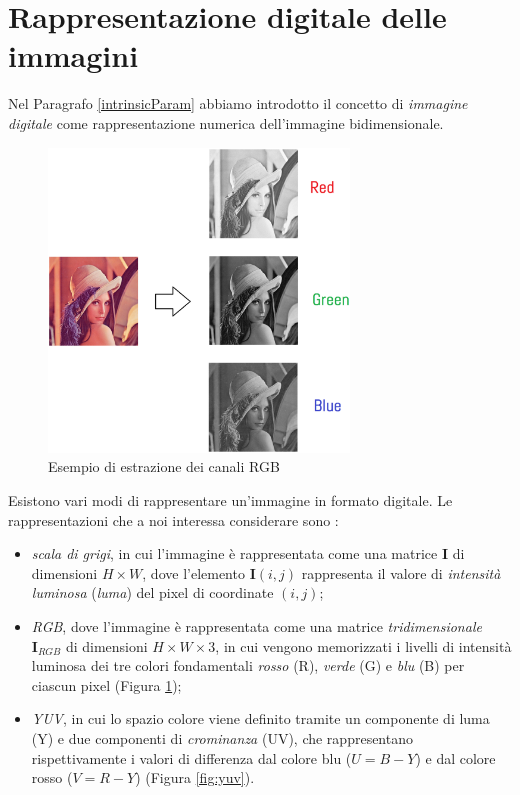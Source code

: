 \section{Rappresentazione digitale delle immagini}
\label{rappresentazImmagini}
Nel Paragrafo \ref{intrinsicParam} abbiamo introdotto il concetto di \textit{immagine digitale} come rappresentazione numerica dell'immagine bidimensionale.
	\begin{figure}[tb]
		\centering
		\includegraphics[width=8cm]{./pictures/lenaRGB}
		\caption{Esempio di estrazione dei canali RGB}
		\label{fig:lenaRGB}
	\end{figure}
Esistono vari modi di rappresentare un'immagine in formato digitale.
Le rappresentazioni che a noi interessa considerare sono \cite{forsyth2002computer}:
\begin{itemize}
	\item \textit{scala di grigi}, in cui l'immagine \`e rappresentata come una matrice $\textbf{I}$ di dimensioni $H \times W$, dove l'elemento $\textbf{I}(i,j)$ rappresenta il valore di \textit{intensit\`a luminosa} (\textit{luma}) del pixel di coordinate $(i, j)$;
	\item \textit{RGB}, dove l'immagine \`e rappresentata come una matrice \textit{tridimensionale} $\textbf{I}_{RGB}$ di dimensioni $H \times W \times 3$, in cui vengono memorizzati i livelli di intensit\`a luminosa dei tre colori fondamentali \textit{rosso} (R), \textit{verde} (G) e \textit{blu} (B) per ciascun pixel (Figura \ref{fig:lenaRGB}); 
	\item \textit{YUV}, in cui lo spazio colore viene definito tramite un componente di luma (Y) e due componenti di \textit{crominanza} (UV), che rappresentano rispettivamente i valori di differenza dal colore blu ($U = B - Y$) e dal colore rosso ($V = R - Y$) (Figura \ref{fig:yuv}).
\end{itemize}
